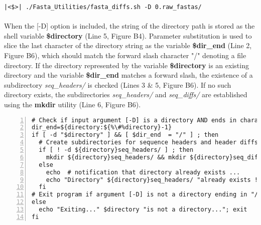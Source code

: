 \vspace*{36pt}

\begin{lstlisting}[caption={Basic usage of \textit{fasta\_diffs.sh} script.}]
|<$>| ./Fasta_Utilities/fasta_diffs.sh -D 0.raw_fastas/
\end{lstlisting}

\clearpage

\paragraph{} When the [-D] option is included, the string of the directory path is stored as the shell variable \textbf{\$directory} (Line 5, Figure B4).  Parameter substitution is used to slice the last character of the directory string as the variable \textbf{\$dir\_end} (Line 2, Figure B6), which should match the forward slash character "/" denoting a file directory.  If the directory represented by the variable \textbf{\$directory} is an existing directory and the variable \textbf{\$dir\_end} matches a forward slash, the existence of a subdirectory \textit{seq\_headers/} is checked (Lines 3 \& 5, Figure B6).  If no such directory exists, the subdirectories \textit{seq\_headers/} and \textit{seq\_diffs/} are established using the \textbf{mkdir} utility (Line 6, Figure B6).

\vspace*{36pt}

\begin{lstlisting}[numbers=left, showstringspaces=false, escapechar=\%, caption={Verify directory existence and create subdirectories.}]
# Check if input argument [-D] is a directory AND ends in character "/".
dir_end=${directory:${%\#%directory}-1}
if [ -d "$directory" ] && [ $dir_end  = "/" ] ; then
  # Create subdirectories for sequence headers and header diffs.
  if [ ! -d ${directory}seq_headers/ ] ; then  
    mkdir ${directory}seq_headers/ && mkdir ${directory}seq_diffs/
  else 
    echo  # notification that directory already exists ...
    echo "Directory" ${directory}seq_headers/ "already exists !"
  fi
# Exit program if argument [-D] is not a directory ending in "/".
else  
  echo "Exiting..." $directory "is not a directory..."; exit
fi
\end{lstlisting}

\vspace*{36pt}

